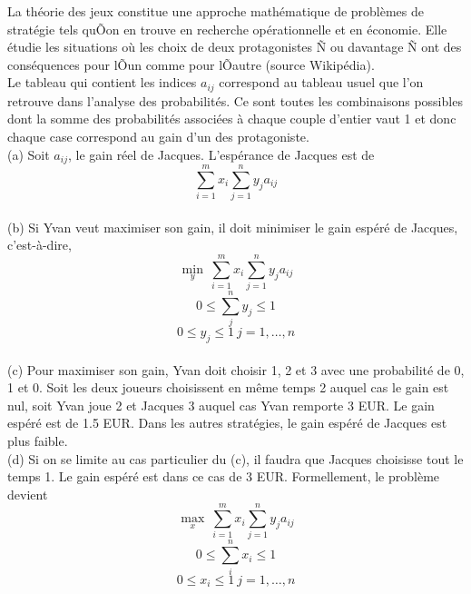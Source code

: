 \begin{enumerate}
\begin{enumerate}
    \end{enumerate}

    \begin{solution}
      La théorie des jeux constitue une approche mathématique de problèmes de stratégie tels quÕon en trouve en recherche opérationnelle et en économie. Elle étudie les situations où les choix de deux protagonistes Ñ ou davantage Ñ ont des conséquences pour lÕun comme pour lÕautre (source Wikipédia). \\
      \newline
      Le tableau qui contient les indices $a_{ij}$ correspond au tableau usuel que l'on retrouve dans l'analyse des probabilités. Ce sont toutes les combinaisons possibles dont la somme des probabilités associées à chaque couple d'entier vaut 1 et donc chaque case correspond au gain d'un des protagoniste. \\
      \newline
      (a) Soit $a_{ij}$, le gain réel de Jacques. L'espérance de Jacques est de $$\sum_{i=1}^{m}x_{i}\sum_{j=1}^{n}y_{j}a_{ij}$$ \\
      (b) Si Yvan veut maximiser son gain, il doit minimiser le gain espéré de Jacques, c'est-à-dire, \\
      $$\min_y ~\sum_{i=1}^{m}x_{i}\sum_{j=1}^{n}y_{j}a_{ij}$$
      $$ 0\le \sum_{j}^{n} y_{j} \le 1$$
      $$ 0 \le y_{j} \le1~j = 1, \dots, n$$ \\
      (c) Pour maximiser son gain, Yvan doit choisir 1, 2 et 3 avec une probabilité de 0, 1 et 0. Soit les deux joueurs choisissent en même temps 2 auquel cas le gain est nul, soit Yvan joue 2 et Jacques 3 auquel cas Yvan remporte 3 EUR. Le gain espéré est de 1.5 EUR. Dans les autres stratégies, le gain espéré de Jacques est plus faible. \\
      \newline
      (d) Si on se limite au cas particulier du (c), il faudra que Jacques choisisse tout le temps 1. Le gain espéré est dans ce cas de 3 EUR. Formellement, le problème devient \\
      $$\max_x ~\sum_{i=1}^{m}x_{i}\sum_{j=1}^{n}y_{j}a_{ij}$$
      $$ 0\le \sum_{i}^{n} x_{i} \le 1$$
      $$ 0 \le x_{i} \le1~j = 1, \dots, n$$ \\
    \end{solution}

\end{enumerate}
